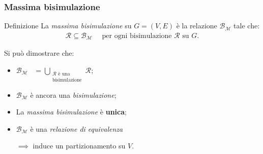 \documentclass{beamer}
\begin{document}
\begin{frame}\frametitle{Massima bisimulazione}
    \begin{block}{Definizione}
        La \emph{massima bisimulazione} su $G = (V,E)$ è la relazione $\mathcal{B}_\mathcal{M}$ tale che:
        \begin{gather*}
            \mathcal{R} \subseteq \mathcal{B}_\mathcal{M} \quad \text{ per ogni bisimulazione } \mathcal{R} \text{ su } G.
        \end{gather*}
    \end{block}

    \bigskip\bigskip

    Si può dimostrare che:
    \begin{itemize}
        \item $\displaystyle \mathcal{B}_\mathcal{M} \,\,\,\,\,= \bigcup_{\substack{\mathcal{R} \text{ è una}\\\text{bisimulazione}}} \mathcal{R}$;
        \item $\mathcal{B}_\mathcal{M}$ è ancora una \emph{bisimulazione};
        \item La \emph{massima bisimulazione} è \textbf{unica};
        \item $\mathcal{B}_\mathcal{M}$ è una \emph{relazione di equivalenza}

        $\implies$ induce un partizionamento su $V$.
    \end{itemize}
\end{frame}
\end{document}
